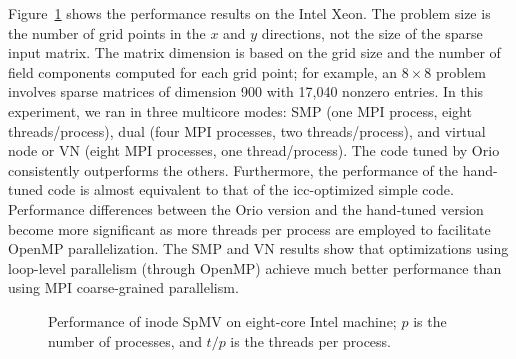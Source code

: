 Figure~\ref{fig:ex27-cookie-results} shows the performance results on the
Intel Xeon. The problem size is the number of grid points in the $x$ and $y$
directions, not the size of the sparse input matrix. The matrix dimension is
based on the grid size and the number of field components computed for each grid
point; for example, an $8 \times 8$ problem involves sparse matrices of
dimension 900 with 17,040 nonzero entries. In this experiment, we ran in
three multicore modes: SMP (one MPI process, eight
threads/process), dual (four MPI processes, two threads/process), and virtual
node or VN (eight MPI processes, one thread/process). The code tuned by Orio
consistently outperforms the others. Furthermore, the performance of
the hand-tuned code is almost equivalent to that of the icc-optimized simple
code. Performance differences between the Orio version and the hand-tuned
version become more significant as more threads per process are employed to
facilitate OpenMP parallelization. The SMP and VN results show that
optimizations using loop-level parallelism (through OpenMP) achieve much
better performance than using MPI coarse-grained parallelism.

\begin{figure}%
\begin{center} 
    
\end{center}
\caption{Performance of inode SpMV on eight-core Intel machine; $p$ is the number of processes, and $t/p$ is the threads per process.} 
\label{fig:ex27-cookie-results} 
\end{figure} 

